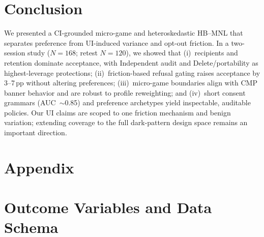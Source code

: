 \documentclass{eusset}
\begin{document}
\section{Conclusion}
\label{sec:conclusion}
We presented a CI-grounded micro-game and heteroskedastic HB--MNL that separates preference from UI-induced variance and opt-out friction. In a two-session study ($N{=}168$; retest $N{=}120$), we showed that (i)~recipients and retention dominate acceptance, with Independent audit and Delete/portability as highest-leverage protections; (ii)~friction-based refusal gating raises acceptance by 3--7\,pp without altering preferences; (iii)~micro-game boundaries align with CMP banner behavior and are robust to profile reweighting; and (iv)~short consent grammars (AUC~$\sim$0.85) and preference archetypes yield inspectable, auditable policies. Our UI claims are scoped to one friction mechanism and benign variation; extending coverage to the full dark-pattern design space remains an important direction.



\appendix
\section*{Appendix}
\section{Outcome Variables and Data Schema}
\begin{table}[ht]
  \centering
  \caption{Outcome variables.}
  \label{tab:variables}
\end{table}
\end{document}
